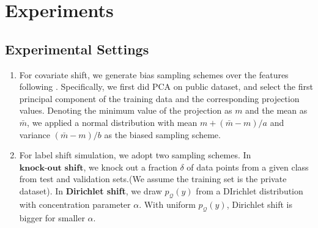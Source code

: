 \documentclass{article}
\def\cQ{\mathcal{Q}}
\theoremstyle{definition}
\begin{document}
\section{Experiments}
\subsection{Experimental Settings}
\begin{enumerate}
	\item For covariate shift, we generate bias sampling schemes over the features following \cite{gre_cov}. Specifically,  we first did PCA on public dataset, and select the first principal component of the training data and the corresponding projection values. Denoting the minimum value of the projection as $m$ and the mean as $\bar{m}$, we applied a normal distribution with mean $m + (\bar{m}-m)/a$ and variance $(\bar{m}-m)/b$ as the biased sampling scheme.
	\item For label shift simulation, we adopt two sampling schemes. In $\textbf{knock-out shift}$, we knock out a fraction $\delta$ of data points from a given class from test and validation sets.(We assume the training set is the private dataset). In \textbf{Dirichlet shift}, we draw $p_\cQ(y)$ from a DIrichlet distribution with concentration parameter $\alpha$. With uniform $p_{\cQ}(y)$, Dirichlet shift is bigger for smaller $\alpha$.
\end{enumerate}
\end{document}

